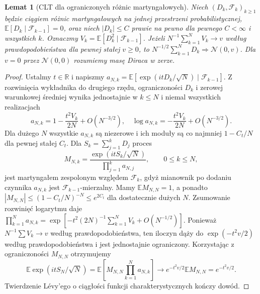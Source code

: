 \documentclass[11pt,a4paper,oneside]{report}
\numberwithin{equation}{chapter}
\theoremstyle{plain}
\newtheorem{lemat}[twierdzenie]{Lemat}
\theoremstyle{definition}
\theoremstyle{remark}
\newcommand{\R}{\mathbb R}
\newcommand{\E}{\mathbb E}
\newcommand{\Normal}{\mathcal N}
\begin{document}
\begin{lemat}[CLT dla ograniczonych różnic martyngałowych]
\label{lem:bounded-martingale-clt}
Niech $(D_k,\mathcal F_k)_{k\ge1}$ będzie ciągiem różnic
martyngałowych na jednej przestrzeni probabilistycznej,
$\E[D_k\mid\mathcal F_{k-1}]=0$, oraz niech
$|D_k|\le C$ prawie na pewno dla pewnego $C<\infty$
i wszystkich $k$. Oznaczmy
$V_k=\E[D_k^2\mid\mathcal F_{k-1}]$.
Jeżeli $N^{-1}\sum_{k=1}^NV_k\to v$ według
prawdopodobieństwa dla pewnej stałej $v\ge0$, to
$N^{-1/2}\sum_{k=1}^ND_k\Rightarrow\Normal(0,v)$.
Dla $v=0$ przez $\Normal(0,0)$ rozumiemy masę Diraca w zerze.
\end{lemat}
\begin{proof}
Ustalmy $t\in\R$ i napiszmy
$a_{N,k}=\E[\exp(itD_k/\sqrt N)\mid\mathcal F_{k-1}]$.
Z rozwinięcia wykładnika do drugiego rzędu, ograniczoności
$D_k$ i zerowej warunkowej średniej wynika jednostajnie
w $k\le N$ i niemal wszystkich realizacjach
\[
 a_{N,k}=1-\frac{t^2V_k}{2N}+O(N^{-3/2}),
 \quad
 \log a_{N,k}=-\frac{t^2V_k}{2N}+O(N^{-3/2}).
\]
Dla dużego $N$ wszystkie $a_{N,k}$ są niezerowe i ich
moduły są co najmniej $1-C_t/N$ dla pewnej stałej $C_t$.
Dla $S_k=\sum_{j=1}^kD_j$ proces
\[
 M_{N,k}=\frac{\exp(itS_k/\sqrt N)}
 {\prod_{j=1}^k a_{N,j}},\qquad 0\le k\le N,
\]
jest martyngałem zespolonym względem $\mathcal F_k$,
gdyż mianownik po dodaniu czynnika $a_{N,k}$ jest
$\mathcal F_{k-1}$-mierzalny. Mamy $\E M_{N,N}=1$,
a ponadto $|M_{N,N}|\le(1-C_t/N)^{-N}\le e^{2C_t}$
dla dostatecznie dużych $N$.
Zsumowanie rozwinięć logarytmu daje
$\prod_{k=1}^N a_{N,k}=
\exp[-t^2(2N)^{-1}\sum_{k=1}^NV_k+O(N^{-1/2})]$.
Ponieważ $N^{-1}\sum V_k\to v$ według prawdopodobieństwa,
ten iloczyn dąży do $\exp(-t^2v/2)$ według
prawdopodobieństwa i jest jednostajnie ograniczony.
Korzystając z ograniczoności $M_{N,N}$ otrzymujemy
\[
 \E\exp(itS_N/\sqrt N)
 =\E\left[M_{N,N}\prod_{k=1}^Na_{N,k}\right]
 \longrightarrow e^{-t^2v/2}\E M_{N,N}
 =e^{-t^2v/2}.
\]
Twierdzenie Lévy'ego o ciągłości funkcji charakterystycznych
kończy dowód.
\end{proof}
\end{document}
